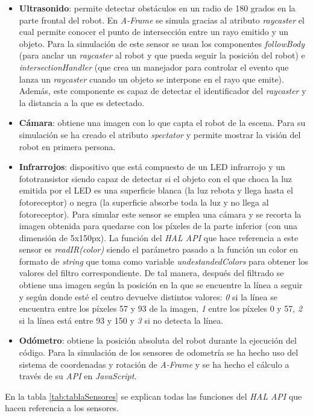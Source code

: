 \begin{itemize}
    \item \textbf{Ultrasonido}: permite detectar obstáculos en un radio de 180 grados en la parte frontal del robot. En \textit{A-Frame} se simula gracias al atributo \textit{raycaster} el cual permite conocer el punto de intersección entre un rayo emitido y un objeto. Para la simulación de este sensor se usan los componentes \textit{followBody} (para anclar un \textit{raycaster} al robot y que pueda seguir la posición del robot) e \textit{intersectionHandler} (que crea un manejador para controlar el evento que lanza un \textit{raycaster} cuando un objeto se interpone en el rayo que emite). Además, este componente es capaz de detectar el identificador del \textit{raycaster} y la distancia a la que es detectado.
    
    \item \textbf{Cámara}: obtiene una imagen con lo que capta el robot de la escena. Para su simulación se ha creado el atributo \textit{spectator} y permite mostrar la visión del robot en primera persona. 
    
    \item \textbf{Infrarrojos}: dispositivo que está compuesto de un LED infrarrojo y un fototransistor siendo capaz de detectar si el objeto con el que choca la luz emitida por el LED es una superficie blanca (la luz rebota y llega hasta el fotoreceptor) o negra (la superficie absorbe toda la luz y no llega al fotoreceptor). 
    Para simular este sensor se emplea una cámara y se recorta la imagen obtenida para quedarse con los píxeles de la parte inferior (con una dimensión de 5x150px). La función del \textit{HAL API} que hace referencia a este sensor es \textit{readIR(color)} siendo el parámetro pasado a la función un color en formato de \textit{string} que toma como variable \textit{undestandedColors} para obtener los valores del filtro correspondiente. De tal manera, después del filtrado se obtiene una imagen según la posición en la que se encuentre la línea a seguir y según donde esté el centro devuelve distintos valores: \textit{0} si la línea se encuentra entre los píxeles 57 y 93 de la imagen, \textit{1} entre los píxeles 0 y 57, \textit{2} si la línea está entre 93 y 150 y \textit{3} si no detecta la línea.
    
    \item \textbf{Odómetro}: obtiene la posición absoluta del robot durante la ejecución del código. Para la simulación de los sensores de odometría se ha hecho uso del sistema de coordenadas y rotación de \textit{A-Frame} y se ha hecho el cálculo a través de su \textit{API} en \textit{JavaScript}. 
\end{itemize}
\clearpage
En la tabla \ref{tab:tablaSensores} se explican todas las funciones del \textit{HAL API} que hacen referencia a los sensores. 

